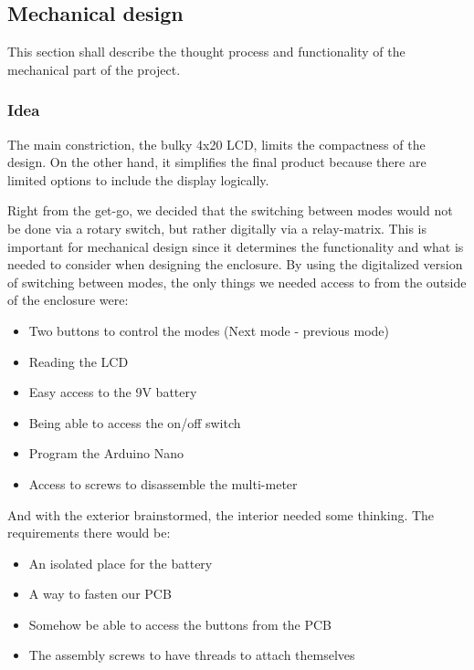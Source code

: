 \newpage
\subsection{Mechanical design}
\label{sec:method_mechanical}
This section shall describe the thought process and functionality of the mechanical part of the project.

\subsubsection{Idea}
The main constriction, the bulky 4x20 LCD, limits the compactness of the design. On the other hand, it simplifies the final product because there are limited options to include the display logically.

Right from the get-go, we decided that the switching between modes would not be done via a rotary switch, but rather digitally via a relay-matrix. This is important for mechanical design since it determines the functionality and what is needed to consider when designing the enclosure. By using the digitalized version of switching between modes, the only things we needed access to from the outside of the enclosure were:
\begin{itemize}
    \item Two buttons to control the modes (Next mode - previous mode)
    \item Reading the LCD
    \item Easy access to the 9V battery
    \item Being able to access the on/off switch
    \item Program the Arduino Nano
    \item Access to screws to disassemble the multi-meter
\end{itemize}
And with the exterior brainstormed, the interior needed some thinking. The requirements there would be:
\begin{itemize}
    \item An isolated place for the battery
    \item A way to fasten our PCB
    \item Somehow be able to access the buttons from the PCB
    \item The assembly screws to have threads to attach themselves
\end{itemize}
\label{sec:points}
\newpage
